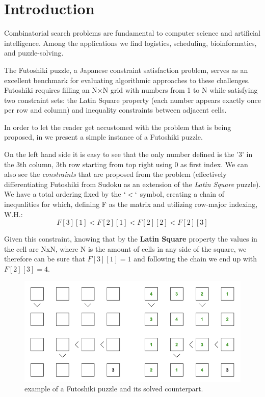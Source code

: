 \section{Introduction}
\label{sec:intro}
Combinatorial search problems are fundamental to computer science and artificial intelligence. Among the applications we find logistics, scheduling, bioinformatics, and puzzle-solving. 

The Futoshiki puzzle, a Japanese constraint satisfaction problem, serves as an excellent benchmark for evaluating algorithmic approaches to these challenges. Futoshiki requires filling an N×N grid with numbers from 1 to N while satisfying two constraint sets: the Latin Square property (each number appears exactly once per row and column) and inequality constraints between adjacent cells.

In order to let the reader get accustomed with the problem that is being proposed, in  we present a simple instance of a Futoshiki puzzle.

On the left hand side it is easy to see that the only number defined is the '3' in the 3th column, 3th row starting from top right using 0 as first index. We can also see the \textit{constraints} that are proposed from the problem (effectively differentiating Futoshiki from Sudoku as an extension of the \textit{Latin Square} puzzle). We have a total ordering fixed by the $`<`$ symbol, creating a chain of inequalities for which, defining F as the matrix and utilizing row-major indexing, W.H.:
\[
\label{futoshiki_inequalities}
    F[3][1] < F[2][1] < F[2][2] < F[2][3] 
\]

Given this constraint, knowing that by the \textbf{Latin Square} property the values in the cell are NxN, where N is the amount of cells in any side of the square, we therefore can be sure that $F[3][1] = 1$ and following the chain we end up with $F[2][3] = 4$.

\begin{figure}[H]
\centering
\includegraphics[scale=0.45]{imgs/futoshiki_example.png}
\caption{example of a Futoshiki puzzle and its solved counterpart.}
    \label{fig:futoshiki_example}
\end{figure}


